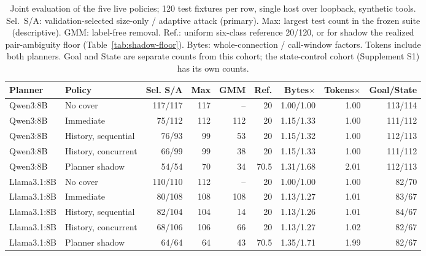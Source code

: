 \begin{table}[t]\centering\small
\caption{Joint evaluation of the five live policies; 120 test fixtures per row, single host over loopback, synthetic tools. Sel.\ S/A: validation-selected size-only / adaptive attack (primary). Max: largest test count in the frozen suite (descriptive). GMM: label-free removal. Ref.: uniform six-class reference 20/120, or for shadow the realized pair-ambiguity floor (Table~\ref{tab:shadow-floor}). Bytes: whole-connection / call-window factors. Tokens include both planners. Goal and State are separate counts from this cohort; the state-control cohort (Supplement S1) has its own counts.}\label{tab:live-timing-main}
\setlength{\tabcolsep}{4pt}
\begin{tabularx}{\textwidth}{@{}lYrrrrrrr@{}}\toprule
Planner & Policy & Sel. S/A & Max & GMM & Ref. & Bytes$\times$ & Tokens$\times$ & Goal/State \\\midrule

Qwen3:8B & No cover & 117/117 & 117 & -- & 20 & 1.00/1.00 & 1.00 & 113/114 \\
Qwen3:8B & Immediate & 75/112 & 112 & 112 & 20 & 1.15/1.33 & 1.00 & 111/112 \\
Qwen3:8B & History, sequential & 76/93 & 99 & 53 & 20 & 1.15/1.32 & 1.00 & 112/113 \\
Qwen3:8B & History, concurrent & 66/99 & 99 & 38 & 20 & 1.15/1.33 & 1.00 & 111/112 \\
Qwen3:8B & Planner shadow & 54/54 & 70 & 34 & 70.5 & 1.31/1.68 & 2.01 & 112/113 \\
Llama3.1:8B & No cover & 110/110 & 112 & -- & 20 & 1.00/1.00 & 1.00 & 82/70 \\
Llama3.1:8B & Immediate & 80/108 & 108 & 108 & 20 & 1.13/1.27 & 1.01 & 83/67 \\
Llama3.1:8B & History, sequential & 82/104 & 104 & 14 & 20 & 1.13/1.26 & 1.01 & 84/67 \\
Llama3.1:8B & History, concurrent & 68/106 & 106 & 66 & 20 & 1.13/1.27 & 1.02 & 82/67 \\
Llama3.1:8B & Planner shadow & 64/64 & 64 & 43 & 70.5 & 1.35/1.71 & 1.99 & 82/67 \\
\bottomrule\end{tabularx}\end{table}

